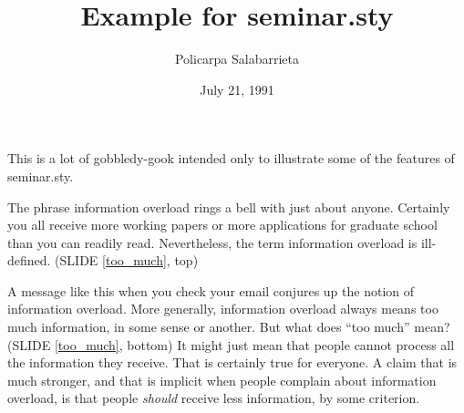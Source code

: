 \documentclass[ignorenonframetext]{beamer}
\title{Example for seminar.sty}
\author{Policarpa Salabarrieta}
\date{July 21, 1991}
\newcommand{\sref}[1]{SLIDE \ref{#1}}
\begin{document}
\frame{
\maketitle          %
}



This is a lot of gobbledy-gook intended only to illustrate some of the
features of seminar.sty.

 The phrase information overload rings a bell with just about anyone.
Certainly you all receive more working papers or more applications for
graduate school than you can readily read. Nevertheless, the term information
overload is ill-defined. (\sref{too_much}, top)

 A message like this when you check your email conjures up the notion of
information overload. More generally, information overload always means too
much information, in some sense or another. But what does ``too much'' mean?
(\sref{too_much}, bottom) It might just mean that people cannot process all
the information they receive. That is certainly true for everyone. A claim
that is much stronger, and that is implicit when people complain about
information overload, is that people {\em should} receive less information, by
some criterion.

{}
\end{document}
